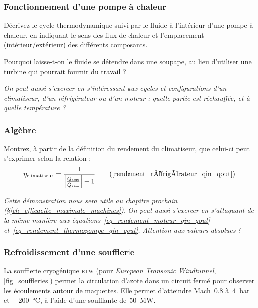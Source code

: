 \subsubsection{Fonctionnement d’une pompe à chaleur}
\label{exo_fonctionnement_thermopompe}

	Décrivez le cycle thermodynamique suivi par le fluide à l’intérieur d’une pompe à chaleur, en indiquant le sens des flux de chaleur et l’emplacement (intérieur/extérieur) des différents composants.
	
	Pourquoi laisse-t-on le fluide se détendre dans une soupape, au lieu d’utiliser une turbine qui pourrait fournir du travail ?
	
	\textit{On peut aussi s’exercer en s’intéressant aux cycles et configurations d’un climatiseur, d’un réfrigérateur ou d’un moteur : quelle partie est réchauffée, et à quelle température ?}


\subsubsection{Algèbre}
\label{exo_algebre_rendement_climatiseur}

	Montrez, à partir de la définition du rendement du climatiseur, que celui-ci peut s’exprimer selon la relation :
			\begin{equation}
				\eta_\text{climatiseur} = \frac{1}{\left| \frac{\dot Q_\out}{\dot Q_\inn} \right| - 1} \tag{\ref{rendement_réfrigérateur_qin_qout}}
			\end{equation}
	
	\textit{Cette démonstration nous sera utile au chapitre prochain (\S\ref{ch_efficacite_maximale_machines}). On peut aussi s’exercer en s’attaquant de la même manière aux équations~\ref{eq_rendement_moteur_qin_qout} et~\ref{eq_rendement_thermopompe_qin_qout}. Attention aux valeurs absolues !}
	
	
\subsubsection{Refroidissement d’une soufflerie}
\label{exo_refrigeration_soufflerie}

	La soufflerie cryogénique \textsc{etw} (pour \textit{European Transonic Windtunnel}, \cref{fig_souffleries}) permet la circulation d’azote dans un circuit fermé pour observer les écoulements autour de maquettes. Elle permet d’atteindre Mach~\num{0,8} à~\SI{4}{\bar} et~\SI{-200}{\celsius}, à l’aide d’une soufflante de~\SI{50}{\mega\watt}.
	
